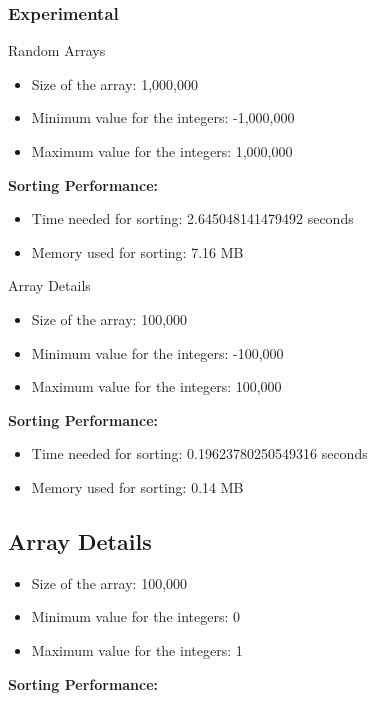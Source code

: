 \documentclass{article}
\begin{document}
\subsubsection{Experimental}

Random Arrays

\begin{itemize}
  \item Size of the array: 1,000,000
  \item Minimum value for the integers: -1,000,000
  \item Maximum value for the integers: 1,000,000
\end{itemize}

\textbf{Sorting Performance:}

\begin{itemize}
  \item Time needed for sorting: 2.645048141479492 seconds
  \item Memory used for sorting: 7.16 MB
\end{itemize}

Array Details

\begin{itemize}
  \item Size of the array: 100,000
  \item Minimum value for the integers: -100,000
  \item Maximum value for the integers: 100,000
\end{itemize}

\textbf{Sorting Performance:}

\begin{itemize}
  \item Time needed for sorting: 0.19623780250549316 seconds
  \item Memory used for sorting: 0.14 MB
\end{itemize}

\subsection*{Array Details}

\begin{itemize}
  \item Size of the array: 100,000
  \item Minimum value for the integers: 0
  \item Maximum value for the integers: 1
\end{itemize}

\textbf{Sorting Performance:}
\end{document}
